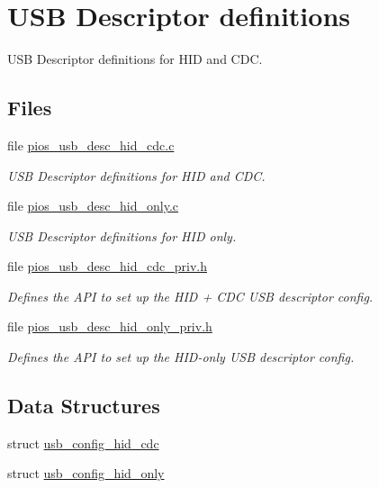 \hypertarget{group___p_i_o_s___u_s_b___d_e_s_c}{\section{U\-S\-B Descriptor definitions}
\label{group___p_i_o_s___u_s_b___d_e_s_c}
}


U\-S\-B Descriptor definitions for H\-I\-D and C\-D\-C.  


\subsection*{Files}
\begin{DoxyCompactItemize}
\item 
file \hyperlink{pios__usb__desc__hid__cdc_8c}{pios\-\_\-usb\-\_\-desc\-\_\-hid\-\_\-cdc.\-c}
\begin{DoxyCompactList}\small\item\em U\-S\-B Descriptor definitions for H\-I\-D and C\-D\-C. \end{DoxyCompactList}\item 
file \hyperlink{pios__usb__desc__hid__only_8c}{pios\-\_\-usb\-\_\-desc\-\_\-hid\-\_\-only.\-c}
\begin{DoxyCompactList}\small\item\em U\-S\-B Descriptor definitions for H\-I\-D only. \end{DoxyCompactList}\item 
file \hyperlink{pios__usb__desc__hid__cdc__priv_8h}{pios\-\_\-usb\-\_\-desc\-\_\-hid\-\_\-cdc\-\_\-priv.\-h}
\begin{DoxyCompactList}\small\item\em Defines the A\-P\-I to set up the H\-I\-D + C\-D\-C U\-S\-B descriptor config. \end{DoxyCompactList}\item 
file \hyperlink{pios__usb__desc__hid__only__priv_8h}{pios\-\_\-usb\-\_\-desc\-\_\-hid\-\_\-only\-\_\-priv.\-h}
\begin{DoxyCompactList}\small\item\em Defines the A\-P\-I to set up the H\-I\-D-\/only U\-S\-B descriptor config. \end{DoxyCompactList}\end{DoxyCompactItemize}
\subsection*{Data Structures}
\begin{DoxyCompactItemize}
\item 
struct \hyperlink{structusb__config__hid__cdc}{usb\-\_\-config\-\_\-hid\-\_\-cdc}
\item 
struct \hyperlink{structusb__config__hid__only}{usb\-\_\-config\-\_\-hid\-\_\-only}
\end{DoxyCompactItemize}
